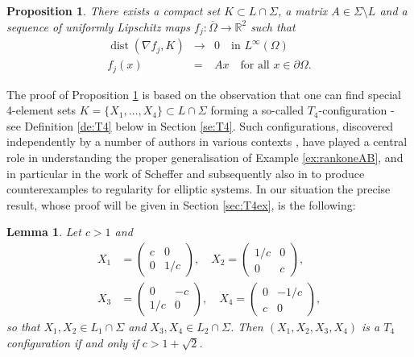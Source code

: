 \documentclass[titlepage]{amsart}
\numberwithin{equation}{section}
\theoremstyle{plain}
\newtheorem{proposition}[equation]{Proposition}
\newtheorem{lemma}[equation]{Lemma}
\theoremstyle{definition}
\theoremstyle{remark}
\newcommand{\dist}{\operatorname{dist}}
\newcommand{\R}{\mathbb{R}}
\newcommand{\g}{\nabla }
\begin{document}
\begin{proposition}\label{prop:noapproxsplit}
There exists a compact set $K \subset L\cap\Sigma$, a 
matrix $A \in \Sigma \setminus L$ and a sequence of uniformly Lipschitz maps $f_j:\overline{\Omega}\to\R^2$ such that
\begin{eqnarray}   \label{eq:Df_to_K0}  
\dist(\g f_j,K) &\to & 0 \quad \text{in $L^\infty(\Omega)$}\\
 \label{eq:affine_boundary01}
f_j(x) &=& Ax \quad \text{for  all $x \in \partial \Omega$.}
\end{eqnarray}	
\end{proposition}
The proof of Proposition \ref{prop:noapproxsplit} is based on the observation that one can find special 4-element sets $K=\{X_1,\dots,X_4\}\subset L\cap\Sigma$ forming a so-called $T_4$-configuration - see Definition \ref{de:T4} below in Section \ref{se:T4}. Such configurations, discovered independently by a number of authors in various contexts \cite{scheffer74,aumann_hart86,nesi_milton91,casadio_tarabusi93,tartar93},  have played a central role in understanding the proper generalisation of Example \ref{ex:rankoneAB}, and in particular in the work of Scheffer \cite{scheffer74} and subsequently also in \cite{muller_sverak03,szekelyhidi04} to produce counterexamples to regularity for elliptic systems. In our situation the precise result, whose proof will be given in Section \ref{sec:T4ex}, is the following:
\begin{lemma}\label{lem:T4}
Let $c>1$ and 
\begin{equation}
\begin{split}
	X_1&=\begin{pmatrix}c&0\\0&1/c\end{pmatrix}, \quad  X_2=\begin{pmatrix}1/c&0\\0&c\end{pmatrix},\\ X_3&=\begin{pmatrix}0&-c\\1/c&0\end{pmatrix}, 
	\quad X_4=\begin{pmatrix}0&-1/c\\c&0\end{pmatrix},
	\end{split}
\end{equation}
so that $X_1,X_2\in L_1\cap \Sigma$ and $X_3,   X_4\in L_2\cap\Sigma$. Then $(X_1,X_2,X_3,X_4)$ is a $T_4$ configuration if and only if
 $c>1+\sqrt{2}$.
 \end{lemma}
\end{document}
